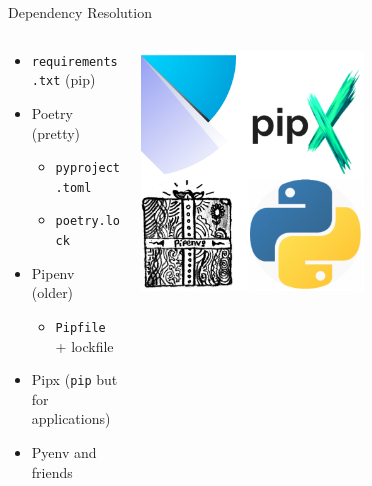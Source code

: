 \documentclass[bigger,unknownkeysallowed,aspectratio=169,red,colorblocks]{beamer}
\begin{document}
\begin{frame}[label={sec:org9332c10},fragile]{Dependency Resolution}
 \begin{columns}
\begin{column}{0.5\columnwidth}
\begin{itemize}
\item \texttt{requirements.txt} (pip)
\item Poetry (pretty)
\begin{itemize}
\item \texttt{pyproject.toml}
\item \texttt{poetry.lock}
\end{itemize}
\item Pipenv (older)
\begin{itemize}
\item \texttt{Pipfile} + lockfile
\end{itemize}
\item Pipx (\texttt{pip} but for applications)
\item Pyenv and friends
\end{itemize}
\end{column}
\begin{column}{0.5\columnwidth}
\begin{center}
\includegraphics[width=0.6\textwidth]{images/Dependency_Resolution/2020-09-20_05-09-56_screenshot.png}
\end{center}
\end{column}
\end{columns}
\end{frame}
\end{document}
